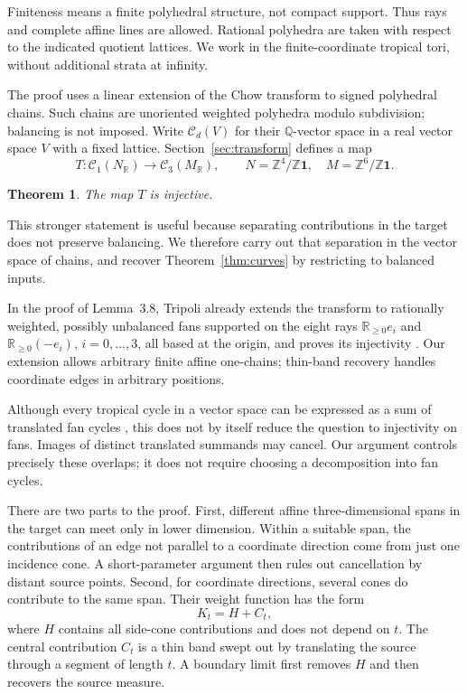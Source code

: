 \documentclass[11pt]{article}
\newtheorem{theorem}{Theorem}[section]
\theoremstyle{definition}
\theoremstyle{remark}
\newcommand{\R}{\mathbb R}
\newcommand{\Q}{\mathbb Q}
\newcommand{\Z}{\mathbb Z}
\newcommand{\one}{\mathbf 1}
\newcommand{\Ch}{\mathcal C}
\newcommand{\NR}{N_{\R}}
\newcommand{\MR}{M_{\R}}
\begin{document}
Finiteness means a finite polyhedral structure, not compact support.
Thus rays and complete affine lines are allowed. Rational polyhedra are
taken with respect to the indicated quotient lattices. We work in the
finite-coordinate tropical tori, without additional strata at infinity.

The proof uses a linear extension of the Chow transform to signed
polyhedral chains. Such chains are unoriented weighted polyhedra modulo
subdivision; balancing is not imposed. Write $\Ch_d(V)$ for their
$\Q$-vector space in a real vector space $V$ with a fixed lattice.
Section~\ref{sec:transform} defines a map
\[
 T:\Ch_1(\NR)\longrightarrow\Ch_3(\MR),\qquad
 N=\Z^4/\Z\one,\quad M=\Z^6/\Z\one.
\]

\begin{theorem}\label{thm:chains}
The map $T$ is injective.
\end{theorem}

This stronger statement is useful because separating contributions in the
target does not preserve balancing. We therefore carry out that separation
in the vector space of chains, and recover Theorem~\ref{thm:curves} by
restricting to balanced inputs.

In the proof of Lemma~3.8, Tripoli already extends the transform to
rationally weighted, possibly unbalanced fans supported on the eight rays
$\R_{\ge0}e_i$ and $\R_{\ge0}(-e_i)$, $i=0,\ldots,3$, all based at the
origin, and proves its injectivity \cite{Tripoli}. Our extension allows
arbitrary finite affine one-chains; thin-band recovery handles coordinate
edges in arbitrary positions.

Although every tropical cycle in a vector space can be expressed as a
sum of translated fan cycles \cite[Theorem~5.4]{AllermannHampeRau}, this does
not by itself reduce the question to injectivity on fans. Images of distinct
translated summands may cancel. Our argument controls precisely these
overlaps; it does not require choosing a decomposition into fan cycles.

There are two parts to the proof. First, different affine
three-dimensional spans in the target can meet only in lower dimension.
Within a suitable span, the contributions of an edge not parallel to a
coordinate direction come from just one incidence cone. A short-parameter
argument then rules out cancellation by distant source points.
Second, for coordinate directions, several cones do contribute to the
same span. Their weight function has the form
\[
 K_t=H+C_t,
\]
where $H$ contains all side-cone contributions and does not depend on $t$.
The central contribution $C_t$ is a thin band swept out by translating
the source through a segment of length $t$. A boundary limit first removes
$H$ and then recovers the source measure.
\end{document}
